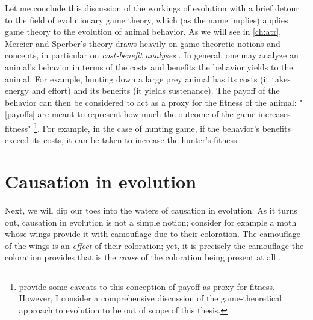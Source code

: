 Let me conclude this discussion of the workings of evolution with a brief detour to the field of evolutionary game theory, which (as the name implies) applies game theory to the evolution of animal behavior.
As we will see in \cref{ch:atr}, Mercier and Sperber's theory draws heavily on game-theoretic notions and concepts, in particular on \emph{cost-benefit analyses} \citep[see][]{Sperber01, Sperber10}.
In general, one may analyze an animal's behavior in terms of the costs and benefits the behavior yields to the animal. For example, hunting down a large prey animal has its costs (it takes energy and effort) and its benefits (it yields sustenance).
The payoff of the behavior can then be considered to act as a proxy for the fitness of the animal: "[payoffs] are meant to represent how much the outcome of the game increases fitness" \citep[p.~118]{McNamara10}\footnote{\citet[\S 4.4]{McNamara10} provide some caveats to this conception of payoff as proxy for fitness. However, I consider a comprehensive discussion of the game-theoretical approach to evolution to be out of scope of this thesis.}. For example, in the case of hunting game, if the behavior's benefits exceed its costs, it can be taken to increase the hunter's fitness.

\section{Causation in evolution}
\label{sec:causation-evolution}

Next, we will dip our toes into the waters of causation in evolution. As it turns out, causation in evolution is not a simple notion; consider for example a moth whose wings provide it with camouflage due to their coloration. The camouflage of the wings is an \emph{effect} of their coloration; yet, it is precisely the camouflage the coloration provides that is the \emph{cause} of the coloration being present at all \citep{Lipton09}.


